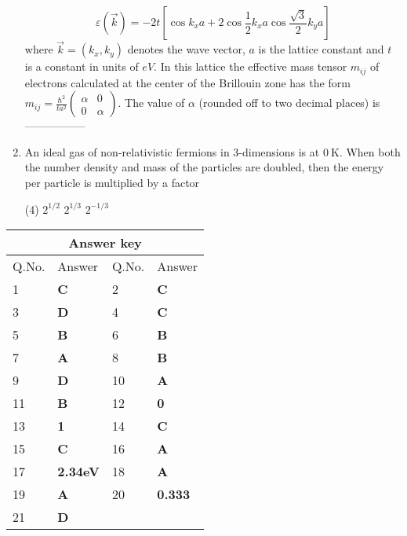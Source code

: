 \begin{enumerate}
	$$
	\varepsilon(\vec{k})=-2 t\left[\cos k_{x} a+2 \cos \frac{1}{2} k_{x} a \cos \frac{\sqrt{3}}{2} k_{y} a\right]
	$$
	where $\vec{k}=\left(k_{x}, k_{y}\right)$ denotes the wave vector, $a$ is the lattice constant and $t$ is a constant in units of $e V .$ In this lattice the effective mass tensor $m_{i j}$ of electrons calculated at the center of the Brillouin zone has the form $m_{i j}=\frac{\hbar^{2}}{t a^{2}}\left(\begin{array}{cc}\alpha & 0 \\ 0 & \alpha\end{array}\right) .$ The value of $\alpha$ (rounded off to two decimal places) is-----------------
{	}
\item An ideal gas of non-relativistic fermions in 3-dimensions is at $0 \mathrm{~K}$. When both the number density and mass of the particles are doubled, then the energy per particle is multiplied by a factor
{}
\begin{tasks}(4)
\task[\textbf{A.}]  $2^{1 / 2}$
\task[\textbf{C.}]  $2^{1 / 3}$
\task[\textbf{D.}] $2^{-1 / 3}$
\end{tasks}
\end{enumerate}
\setlength\arrayrulewidth{1pt}
\begin{table}[H]
	\centering
	\begin{tabular}{|p{1.5cm}|p{1.5cm}||p{1.5cm}|p{1.5cm}|}
		\hline
		\multicolumn{4}{|c|}{\textbf{Answer key}}\\\hline\hline
		\rowcolor{ocrel}Q.No.&Answer&Q.No.&Answer\\\hline
		1&\textbf{C} &2&\textbf{C}\\\hline 
		3&\textbf{D} &4&\textbf{C} \\\hline
		5&\textbf{B} &6&\textbf{B} \\\hline
		7&\textbf{A}&8&\textbf{B}\\\hline
		9&\textbf{D}&10&\textbf{A}\\\hline
		11&\textbf{B} &12&\textbf{0}\\\hline
		13&\textbf{1}&14&\textbf{C}\\\hline
		15&\textbf{C}&16&\textbf{A} \\\hline
		17&\textbf{2.34eV}&18&\textbf{A}\\\hline
		19&\textbf{A}&20&\textbf{0.333}\\\hline
		21&\textbf{D}&&\textbf{}\\\hline
	\end{tabular}
\end{table}

